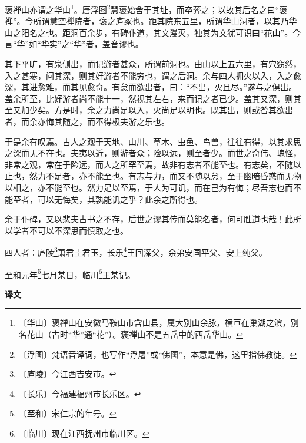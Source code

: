 \documentclass[12pt,UTF-8,openany,a4]{ctexbook}
\begin{document}
\begin{large}
    
    褒禅山亦谓之华山\footnote{〔华山〕\yiwen 褒禅山在安徽马鞍山市含山县，属大别山余脉，横亘在巢湖之滨，别名花山（古时“华”通“花”）。褒禅山不是五岳中的西岳华山。}。唐浮图\footnote{〔浮图〕\yiwen 梵语音译词，也写作“浮屠”或“佛图”，本意是佛，这里指佛教徒。}慧褒始舍于其址，而卒葬之；以故其后名之曰“褒禅”。今所谓慧空禅院者，褒之庐冢也。距其院东五里，所谓华山洞者，以其乃华山之阳名之也。距洞百余步，有碑仆道，其文漫灭，独其为文犹可识曰“花山”。今言“华”如“华实”之“华”者，盖音谬也。
    
    其下平旷，有泉侧出，而记游者甚众，所谓前洞也。由山以上五六里，有穴窈然，入之甚寒，问其深，则其好游者不能穷也，谓之后洞。余与四人拥火以入，入之愈深，其进愈难，而其见愈奇。有怠而欲出者，曰：“不出，火且尽。”遂与之俱出。盖余所至，比好游者尚不能十一，然视其左右，来而记之者已少。盖其又深，则其至又加少矣。方是时，余之力尚足以入，火尚足以明也。既其出，则或咎其欲出者，而余亦悔其随之，而不得极夫游之乐也。
    
    于是余有叹焉。古人之观于天地、山川、草木、虫鱼、鸟兽，往往有得，以其求思之深而无不在也。夫夷以近，则游者众；险以远，则至者少。而世之奇伟、瑰怪，非常之观，常在于险远，而人之所罕至焉，故非有志者不能至也。有志矣，不随以止也，然力不足者，亦不能至也。有志与力，而又不随以怠，至于幽暗昏惑而无物以相之，亦不能至也。然力足以至焉，于人为可讥，而在己为有悔；尽吾志也而不能至者，可以无悔矣，其孰能讥之乎？此余之所得也。
    
    余于仆碑，又以悲夫古书之不存，后世之谬其传而莫能名者，何可胜道也哉！此所以学者不可以不深思而慎取之也。
    
    四人者：庐陵\footnote{〔庐陵〕\yiwen 今江西吉安市。}萧君圭君玉，长乐\footnote{〔长乐〕\yiwen 今福建福州市长乐区。}王回深父，余弟安国平父、安上纯父。
    
    至和元年\footnote{〔至和〕\yiwen 宋仁宗的年号。}七月某日，临川\footnote{〔临川〕\yiwen 现在江西抚州市临川区。}王某记。
\end{large}


\newpage

\begin{Large}
    \noindent\textbf{译文}
\end{Large}


\vspace{1em}
\end{document}
